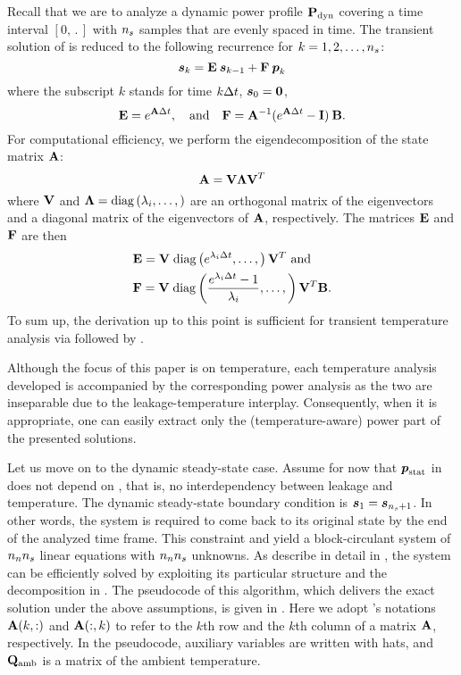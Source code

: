 Recall that we are to analyze a dynamic power profile $\mathbf{P}_{\mathrm{dyn}}$ covering a
time interval $[0, \period]$ with ${n_{s}}$ samples that are evenly spaced in
time. The transient solution of  is reduced to the
following recurrence for $k = 1, 2, \dots, {n_{s}}$:
\[
  \boldsymbol{s}_k = \mathbf{E} \: \boldsymbol{s}_{k - 1} + \mathbf{F} \: \boldsymbol{p}_k
\]
where the subscript $k$ stands for time $k \Delta t$, $\boldsymbol{s}_0 = \boldsymbol{0}$,
\[
  \mathbf{E} = e^{\mathbf{A} \Delta t}, \hspace{1em} \text{and} \hspace{1em}
  \mathbf{F} = \mathbf{A}^{-1} (e^{\mathbf{A} \Delta t} - \mathbf{I}) \: \mathbf{B}.
\]
For computational efficiency, we perform the eigendecomposition of the state
matrix $\mathbf{A}$:
\[
  \mathbf{A} = \mathbf{V} \mathbf{\Lambda} \mathbf{V}^T
\]
where $\mathbf{V}$ and $\m{\Lambda} = \diagonal{\lambda_i}{}$ are an
orthogonal matrix of the eigenvectors and a diagonal matrix of the eigenvectors
of $\mathbf{A}$, respectively. The matrices $\mathbf{E}$ and $\mathbf{F}$ are then
\begin{align*}
  & \m{E} = \m{V} \; \diagonal{e^{\lambda_i \dt}}{} \m{V}^T \text{ and} \\
  & \m{F} = \m{V} \; \diagonal{\frac{e^{\lambda_i \dt} - 1}{\lambda_i}}{} \m{V}^T \m{B}.
\end{align*}
To sum up, the derivation up to this point is sufficient for transient
temperature analysis via  followed by
.

\begin{remark}
Although the focus of this paper is on temperature, each temperature analysis
developed is accompanied by the corresponding power analysis as the two are
inseparable due to the leakage-temperature interplay. Consequently, when it is
appropriate, one can easily extract only the (temperature-aware) power part of
the presented solutions.
\end{remark}

Let us move on to the dynamic steady-state case. Assume for now that
$\boldsymbol{p}_{\mathrm{stat}}$ in  does not depend on \vq, that is, no
interdependency between leakage and temperature. The dynamic steady-state
boundary condition is $\boldsymbol{s}_1 = \boldsymbol{s}_{{n_{s}} + 1}$. In other words, the system is
required to come back to its original state by the end of the analyzed time
frame. This constraint and  yield a block-circulant system of
${n_{n}} {n_{s}}$ linear equations with ${n_{n}} {n_{s}}$ unknowns. As describe in detail in
\cite{ukhov2012}, the system can be efficiently solved by exploiting its
particular structure and the decomposition in . The
pseudocode of this algorithm, which delivers the exact solution under the above
assumptions, is given in . Here we
adopt 's \cite{matlab} notations $\mathbf{A}(k, :)$ and $\mathbf{A}(:, k)$ to
refer to the $k$th row and the $k$th column of a matrix $\mathbf{A}$, respectively.
In the pseudocode, auxiliary variables are written with hats, and $\mathbf{Q}_{\mathrm{amb}}$
is a matrix of the ambient temperature.

